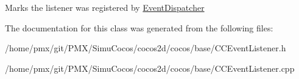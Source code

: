 Marks the listener was registered by \hyperlink{classEventDispatcher}{Event\+Dispatcher} 

The documentation for this class was generated from the following files\+:\begin{DoxyCompactItemize}
\item 
/home/pmx/git/\+P\+M\+X/\+Simu\+Cocos/cocos2d/cocos/base/C\+C\+Event\+Listener.\+h\item 
/home/pmx/git/\+P\+M\+X/\+Simu\+Cocos/cocos2d/cocos/base/C\+C\+Event\+Listener.\+cpp\end{DoxyCompactItemize}
